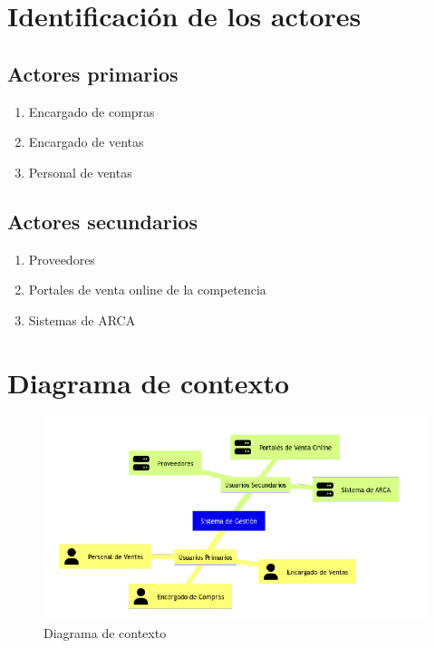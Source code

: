 
\section{Identificación de los actores}

\subsection*{Actores primarios}
\begin{enumerate}
	\item Encargado de compras
	\item Encargado de ventas
	\item Personal de ventas
\end{enumerate}

\subsection*{Actores secundarios}
\begin{enumerate}
	\item Proveedores 
	\item Portales de venta online de la competencia
	\item Sistemas de ARCA
\end{enumerate}

\section{Diagrama de contexto}

\begin{figure}[H]
	\vspace{20pt}
	\centering
	\vspace{15pt}
	\includegraphics[width=.9\textwidth]{img/00-diagrama-contexto}
	\caption{Diagrama de contexto}
	\vspace{15pt}
\end{figure}